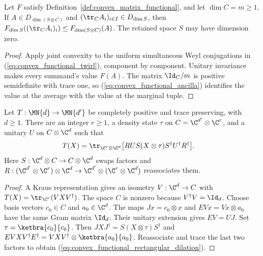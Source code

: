 \begin{theorem}
    \label{thm:convex_functional_partial_trace}
    \leanok
    Let $F$ satisfy Definition~\ref{def:convex_matrix_functional}, and let
    $\dim C=m\ge1$. If $A\in D_{\dim(S\otimes C)}$ and
    $(\tr_C A_i)_{i\in I}\in D_{\dim S}$, then
    $F_{\dim S}((\tr_C A_i)_i)\le F_{\dim(S\otimes C)}(A)$.
    The retained space $S$ may have dimension zero.
\end{theorem}
\begin{proof}
    \leanok
    Apply joint convexity to the uniform simultaneous Weyl conjugations in
    (\ref{eq:convex_functional_twirl}), component by component. Unitary
    invariance makes every summand's value $F(A)$. The matrix $\Id_C/m$ is
    positive semidefinite with trace one, so
    (\ref{eq:convex_functional_ancilla}) identifies the value at the average
    with the value at the marginal tuple.
\end{proof}

\begin{theorem}
    \label{thm:convex_functional_rectangular_dilation}
    \leanok
    Let $T:\MN{d}\to\MN{d'}$ be completely positive and trace preserving,
    with $d\ge1$. There are an integer $r\ge1$, a density state
    $\tau$ on $C=\C^{d'}\otimes\C^r$, and a unitary $U$ on
    $C\otimes\C^d$ such that
    \begin{align}
        T(X)&=\tr_{\C^r\otimes\C^d}
            \bigl[R U S(X\otimes\tau)S^\dagger U^\dagger R^\dagger\bigr].
        \label{eq:convex_functional_rectangular_dilation}
    \end{align}
    Here $S:\C^d\otimes C\to C\otimes\C^d$ swaps factors and
    $R:(\C^{d'}\otimes\C^r)\otimes\C^d
       \to\C^{d'}\otimes(\C^r\otimes\C^d)$ reassociates them.
\end{theorem}
\begin{proof}
    \leanok
    A Kraus representation gives an isometry $V:\C^d\to C$ with
    $T(X)=\tr_{\C^r}(VXV^\dagger)$. The space $C$ is nonzero because
    $V^\dagger V=\Id_d$. Choose basis vectors $c_0\in C$ and $a_0\in\C^d$.
    The maps $Jx=c_0\otimes x$ and $EVx=Vx\otimes a_0$ have the same
    Gram matrix $\Id_d$. Their unitary extension gives $EV=UJ$.
    Set $\tau=\ketbra{c_0}{c_0}$. Then
    $JXJ^\dagger=S(X\otimes\tau)S^\dagger$ and
    $EVXV^\dagger E^\dagger=VXV^\dagger\otimes\ketbra{a_0}{a_0}$.
    Reassociate and trace the last two factors to obtain
    (\ref{eq:convex_functional_rectangular_dilation}).
\end{proof}

